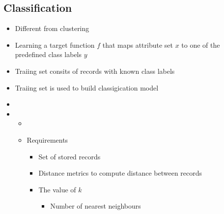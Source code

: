 \subsection{Classification}
\begin{itemize}
    \item Different from clustering
    \item Learning a target function $f$ that maps attribute set $x$ to one of the predefined class labels $y$
    \item Traiing set consits of records with known class labels
    \item Traiing set is used to build classigication model
    \item
    \item
        \begin{itemize}
            \item
        \end{itemize}
        \begin{itemize}
            \item Requirements
                \begin{itemize}
                    \item Set of stored records
                    \item Distance metrics to compute distance between records
                    \item The value of $k$
                        \begin{itemize}
                            \item Number of nearest neighbours
                        \end{itemize}
                \end{itemize}
        \end{itemize}
\end{itemize}
